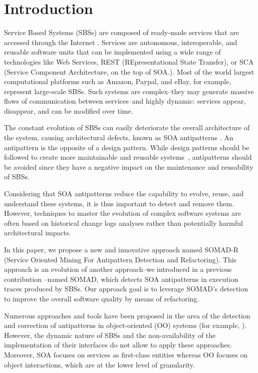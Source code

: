 \documentclass[lnbip]{svmultln}
\begin{document}
\section{Introduction}
%

Service Based Systems (SBSs) are composed of ready-made services that are accessed through the Internet \cite{Erl}. Services are autonomous, interoperable, and reusable software units that can be implemented using a wide range of technologies like Web Services, REST (REpresentational State Transfer), or SCA (Service Component Architecture, on the top of SOA.). Most of the world largest computational platforms such as Amazon, Paypal, and eBay, for example, represent large-scale SBSs. Such systems are complex--they may generate massive flows of communication between services--and highly dynamic: services appear, disappear, and can be modified over time. 

The constant evolution of SBSs can easily deteriorate the overall architecture of the system, causing architectural defects, known as SOA antipatterns \cite{Palma}.
An antipattern is the opposite of a design pattern. While design patterns should be followed to create more maintainable and reusable systems~\cite{wolfgang1994design}, antipatterns should be avoided since they have a negative impact on the maintenance and reusability of SBSs. 

Considering that SOA antipatterns reduce the capability to evolve, reuse, and understand these systems, it is thus important to detect and remove them. However, techniques to master the evolution of complex software systems are often based on historical change logs analyses rather than potentially harmful architectural impacts. 

In this paper, we propose a new and innovative approach named SOMAD-R (Service Oriented Mining For Antipattern Detection and Refactoring). This approach is an evolution of another approach--we introduced in a previous contribution \cite{Nayrolles2013a}--named SOMAD, which detects SOA antipatterns in execution traces produced by SBSs. Our approach goal is to leverage SOMAD’s detection to improve the overall software quality by means of refactoring.

Numerous approaches and tools have been proposed in the area of the detection and correction of antipatterns in object-oriented (OO) systems (for example, \cite{kessentini2011design, erni1996applying, fenton1998software, Moha2010, opdyke1992refactoring}). However, the dynamic nature of SBSs and the non-availability of the implementation of their interfaces do not allow to apply these approaches. Moreover, SOA focuses on services as first-class entities whereas OO focuses on object interactions, which are at the lower level of granularity.
\end{document}
